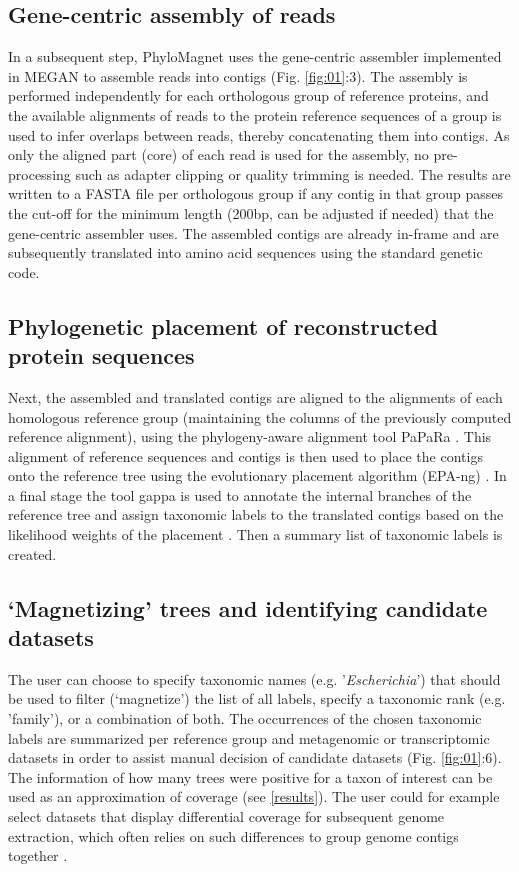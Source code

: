 \documentclass{bioinfo}
\begin{document}
\begin{methods}
\subsection{Gene-centric assembly of reads}\label{gc-assembly}
In a subsequent step, PhyloMagnet uses the gene-centric assembler implemented in MEGAN \citep{Huson2016,Huson2017} to assemble reads into contigs (Fig. \ref{fig:01}:3). The assembly is performed independently for each orthologous group of reference proteins, and the available alignments of reads to the protein reference sequences of a group is used to infer overlaps between reads, thereby concatenating them into contigs. As only the aligned part (core) of each read is used for the assembly, no pre-processing such as adapter clipping or quality trimming is needed. The results are written to a FASTA file per orthologous group if any contig in that group passes the cut-off for the minimum length (200bp, can be adjusted if needed) that the gene-centric assembler uses. The assembled contigs are already in-frame and are subsequently translated into amino acid sequences using the standard genetic code.

\subsection{Phylogenetic placement of reconstructed protein sequences}
Next, the assembled and translated contigs are aligned to the alignments of each homologous reference group (maintaining the columns of the previously computed reference alignment), using the phylogeny-aware alignment tool PaPaRa \citep[Fig. \ref{fig:01}:4;][]{Berger2011a}. This alignment of reference sequences and contigs is then used to place the contigs onto the reference tree using the evolutionary placement algorithm (EPA-ng) \citep[Fig. \ref{fig:01}:5;][]{Berger2011b,Barbera2019}. In a final stage the tool gappa is used to annotate the internal branches of the reference tree and assign taxonomic labels to the translated contigs based on the likelihood weights of the placement \citep{Czech2018}. Then a summary list of taxonomic labels is created.

\subsection{‘Magnetizing’ trees and identifying candidate datasets}
The user can choose to specify taxonomic names (e.g. '\textit{Escherichia}') that should be used to filter (‘magnetize’) the list of all labels, specify a taxonomic rank (e.g. 'family'), or a combination of both. The occurrences of the chosen taxonomic labels are summarized per reference group and metagenomic or transcriptomic datasets  in order to assist manual decision of candidate datasets (Fig. \ref{fig:01}:6). The information of how many trees were positive for a taxon of interest can be used as an approximation of coverage (see \ref{results}). The user could for example select datasets that display differential coverage for subsequent genome extraction, which often relies on such differences to group genome contigs together \citep{Albertsen2013,Alneberg2014}. 


\end{methods}
\end{document}
